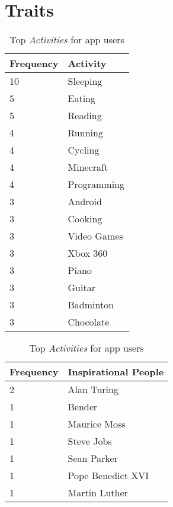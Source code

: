 
\appendix

\chapter{Traits}
\label{app:app1}

\begin{table}[htb!]
\begin{minipage}[b]{.50\textwidth}
\centering
  \begin{tabular}{|l|l|} %
  \hline
  		\textbf{Frequency} & \textbf{Activity} \\ \hline
  		10 & Sleeping \\ \hline
		5 & Eating \\ \hline
		5 & Reading \\ \hline
		4 & Running \\ \hline
		4 & Cycling \\ \hline
		4 & Minecraft \\ \hline
		4 & Programming \\ \hline
		3 & Android \\ \hline
		3 & Cooking \\ \hline
		3 & Video Games \\ \hline
		3 & Xbox 360 \\ \hline
		3 & Piano \\ \hline
		3 & Guitar \\ \hline
		3 & Badminton \\ \hline
		3 & Chocolate \\ \hline
  \end{tabular}
  \caption{Top \emph{Activities} for app users}  
\end{minipage}
\begin{minipage}[b]{.50\textwidth}
\centering
  \begin{tabular}{|l|l|} %
  \hline
  		\textbf{Frequency} & \textbf{Inspirational People} \\ \hline
  		2 & Alan Turing \\ \hline
		1 & Bender \\ \hline
		1 & Maurice Moss \\ \hline
		1 & Steve Jobs \\ \hline
		1 & Sean Parker \\ \hline
		1 & Pope Benedict XVI \\ \hline
		1 & Martin Luther \\ \hline

\end{tabular}
\end{minipage}
\end{table}
